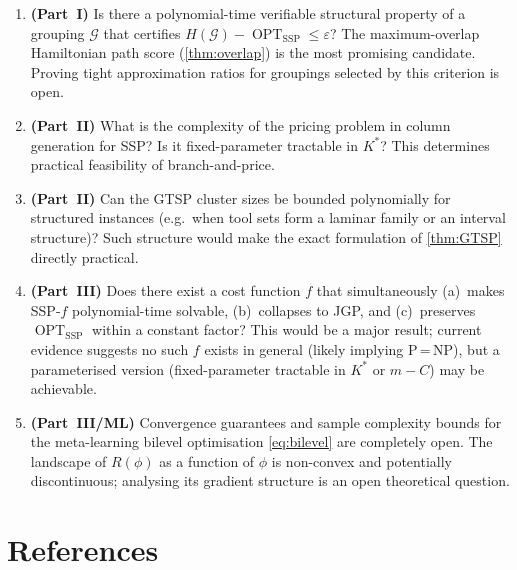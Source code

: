 \documentclass[11pt,a4paper]{article}
\theoremstyle{plain}
\theoremstyle{definition}
\DeclareMathOperator{\OPT}{OPT}
\newcommand{\calG}{\mathcal{G}}     %
\newcommand{\Heur}{H}               %
\newcommand{\Kstar}{K^{*}}          %
\begin{document}
\begin{enumerate}[label=\textbf{Q\arabic*.}]

  \item \textbf{(Part~I)} Is there a polynomial-time verifiable structural property of a
        grouping $\calG$ that certifies $\Heur(\calG) - \OPT_{\text{SSP}} \le \varepsilon$?
        The maximum-overlap Hamiltonian path score (\cref{thm:overlap}) is the most
        promising candidate. Proving tight approximation ratios for groupings selected by
        this criterion is open.

  \item \textbf{(Part~II)} What is the complexity of the pricing problem in column
        generation for SSP? Is it fixed-parameter tractable in $\Kstar$?
        This determines practical feasibility of branch-and-price.

  \item \textbf{(Part~II)} Can the GTSP cluster sizes be bounded polynomially for
        structured instances (e.g.\ when tool sets form a laminar family or an
        interval structure)? Such structure would make the exact formulation of
        \cref{thm:GTSP} directly practical.

  \item \textbf{(Part~III)} Does there exist a cost function $f$ that simultaneously
        (a)~makes SSP-$f$ polynomial-time solvable,
        (b)~collapses to JGP, and
        (c)~preserves $\OPT_{\text{SSP}}$ within a constant factor?
        This would be a major result; current evidence suggests no such $f$ exists
        in general (likely implying P\,=\,NP), but a parameterised version
        (fixed-parameter tractable in $\Kstar$ or $m-C$) may be achievable.

  \item \textbf{(Part~III/ML)} Convergence guarantees and sample complexity bounds
        for the meta-learning bilevel optimisation \eqref{eq:bilevel} are completely open.
        The landscape of $R(\phi)$ as a function of $\phi$ is non-convex and
        potentially discontinuous; analysing its gradient structure is an open
        theoretical question.

\end{enumerate}

\section*{References}
\end{document}
